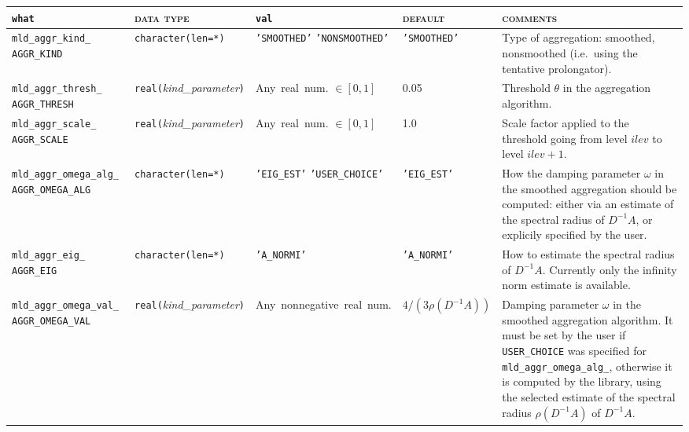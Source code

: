 \bsideways
\begin{center}
\begin{tabular}{|p{5cm}|l|p{2.4cm}|p{2.4cm}|p{6cm}|}
\hline
\verb|what|              & \textsc{data type}        &  \verb|val|      &  \textsc{default}  &
\textsc{comments} \\ \hline
\verb|mld_aggr_kind_|  \break \verb|AGGR_KIND|  & \verb|character(len=*)|
                         & \texttt{'SMOOTHED'} \hspace{2.5cm} \texttt{'NONSMOOTHED'}
                         & \texttt{'SMOOTHED'}
                         & Type of aggregation: smoothed, nonsmoothed
                         (i.e.\ using the tentative prolongator). \\
  \hline
\verb|mld_aggr_thresh_| \break \verb|AGGR_THRESH| & \verb|real(|\emph{kind\_parameter}\verb|)|
                         & Any~real~num. $\in [0, 1]$
                         & 0.05
                         & Threshold $\theta$ in the aggregation algorithm. \\ \hline
\verb|mld_aggr_scale_| \break \verb|AGGR_SCALE| & \verb|real(|\emph{kind\_parameter}\verb|)|
                         & Any~real~num. $\in [0, 1]$
                         & 1.0
                         & Scale factor applied to the threshold going
                           from level $ilev$ to level $ilev+1$. \\ \hline
\verb|mld_aggr_omega_alg_|  \break \verb|AGGR_OMEGA_ALG|& \verb|character(len=*)|
                         & \texttt{'EIG\_EST'} \hspace{2.5cm} \texttt{'USER\_CHOICE'}
                         & \texttt{'EIG\_EST'}
                         & How the damping parameter $\omega$ in the
                           smoothed aggregation should be computed:
                           either via an estimate of the spectral radius of
                           $D^{-1}A$, or explicily
                           specified by the user. \\ \hline
\verb|mld_aggr_eig_|  \break \verb|AGGR_EIG|    & \verb|character(len=*)|
                         & \texttt{'A\_NORMI'}
                         & \texttt{'A\_NORMI'}
                         & How to estimate the spectral radius of $D^{-1}A$.
                           Currently only the infinity norm estimate
                           is available. \\ \hline
\verb|mld_aggr_omega_val_| \break \verb|AGGR_OMEGA_VAL|    & \verb|real(|\emph{kind\_parameter}\verb|)|
                         & Any~nonnegative~real~num.
                         & $4/(3\rho(D^{-1}A))$
                         & Damping parameter $\omega$ in the smoothed aggregation algorithm. 
                           It must be set by the user if
                           \verb|USER_CHOICE| was specified for 
                           \verb|mld_aggr_omega_alg_|,
                           otherwise it is computed by the library, using the
                           selected estimate of the spectral radius $\rho(D^{-1}A)$ of
                           $D^{-1}A$.\\
\hline
\end{tabular}
\end{center}
